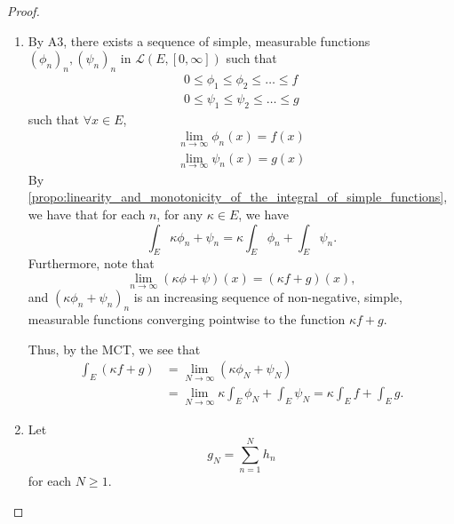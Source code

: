 \documentclass[notoc,notitlepage]{tufte-book}
\begin{document}
\begin{proof}
  \begin{enumerate}
    \item By A3, there exists a sequence of simple, measurable functions
      $(\phi_n)_n, (\psi_n)_n$ in $\mathcal{L}(E, [0, \infty])$ such that
      \begin{gather*}
        0 \leq \phi_1 \leq \phi_2 \leq \hdots \leq f \\
        0 \leq \psi_1 \leq \psi_2 \leq \hdots \leq g
      \end{gather*}
      such that $\forall x \in E$,
      \begin{gather*}
        \lim_{n \to \infty} \phi_n(x) = f(x) \\
        \lim_{n \to \infty} \psi_n(x) = g(x)
      \end{gather*}
      By
      \cref{propo:linearity_and_monotonicity_of_the_integral_of_simple_functions},
      we have that for each $n$, for any $\kappa \in E$, we have
      \begin{equation*}
        \int_{E} \kappa \phi_n + \psi_n = \kappa \int_{E} \phi_n + \int_{E}
        \psi_n.
      \end{equation*}
      Furthermore, note that
      \begin{equation*}
        \lim_{n \to \infty} (\kappa \phi + \psi)(x) = (\kappa f + g)(x),
      \end{equation*}
      and $(\kappa \phi_n + \psi_n)_n$ is an increasing  sequence of non-negative, simple,
      measurable functions converging pointwise to the function $\kappa f + g$.

      Thus, by the MCT, we see that
      \begin{align*}
        \int_{E} (\kappa f + g)
        &= \lim_{N \to \infty} (\kappa \phi_N + \psi_N) \\
        &= \lim_{N \to \infty} \kappa \int_{E} \phi_N + \int_{E} \psi_N
        = \kappa \int_{E} f + \int_{E} g.
      \end{align*}

    \item {} Let
      \begin{equation*}
        g_N = \sum_{n=1}^{N} h_n
      \end{equation*}
      for each $N \geq 1$.


\end{enumerate}
\end{proof}
\end{document}
